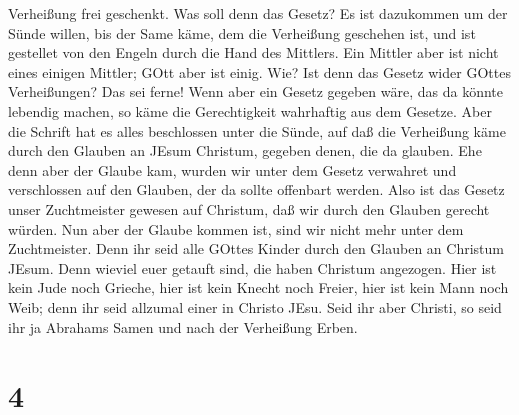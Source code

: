 Verheißung frei geschenkt.  Was soll denn das Gesetz? Es
ist dazukommen um der Sünde willen, bis der Same käme, dem die
Verheißung geschehen ist, und ist gestellet von den Engeln durch die
Hand des Mittlers.  Ein Mittler aber ist nicht eines
einigen Mittler; GOtt aber ist einig.  Wie? Ist denn das
Gesetz wider GOttes Verheißungen? Das sei ferne! Wenn aber ein Gesetz
gegeben wäre, das da könnte lebendig machen, so käme die Gerechtigkeit
wahrhaftig aus dem Gesetze.  Aber die Schrift hat es alles
beschlossen unter die Sünde, auf daß die Verheißung käme durch den
Glauben an JEsum Christum, gegeben denen, die da glauben. 
Ehe denn aber der Glaube kam, wurden wir unter dem Gesetz verwahret und
verschlossen auf den Glauben, der da sollte offenbart werden.
 Also ist das Gesetz unser Zuchtmeister gewesen auf
Christum, daß wir durch den Glauben gerecht würden.  Nun
aber der Glaube kommen ist, sind wir nicht mehr unter dem Zuchtmeister.
 Denn ihr seid alle GOttes Kinder durch den Glauben an
Christum JEsum.  Denn wieviel euer getauft sind, die haben
Christum angezogen.  Hier ist kein Jude noch Grieche, hier
ist kein Knecht noch Freier, hier ist kein Mann noch Weib; denn ihr seid
allzumal einer in Christo JEsu.  Seid ihr aber Christi, so
seid ihr ja Abrahams Samen und nach der Verheißung Erben.

\hypertarget{section-3}{%
\section{4}\label{section-3}}


